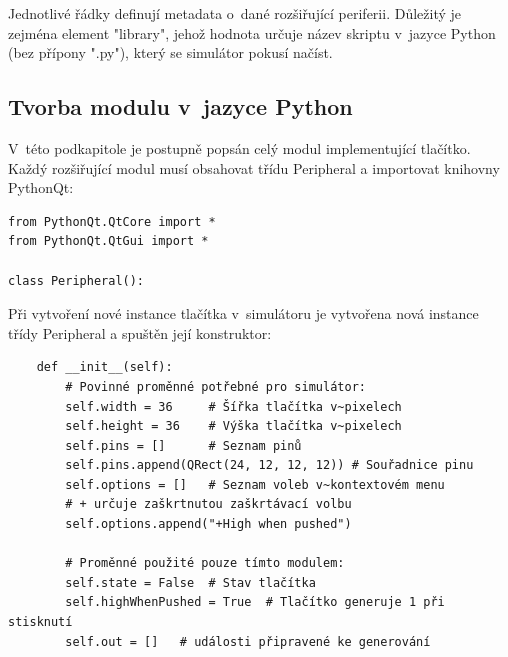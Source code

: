 Jednotlivé řádky definují metadata o~dané rozšiřující periferii. Důležitý je zejména element "library", jehož hodnota určuje název skriptu v~jazyce Python (bez přípony ".py"), který se simulátor pokusí načíst.

\subsection{Tvorba modulu v~jazyce Python}

V~této podkapitole je postupně popsán celý modul implementující tlačítko. Každý rozšiřující modul musí obsahovat třídu Peripheral a importovat knihovny PythonQt:

\begin{lstlisting}
from PythonQt.QtCore import *
from PythonQt.QtGui import *

class Peripheral():
\end{lstlisting}

Při vytvoření nové instance tlačítka v~simulátoru je vytvořena nová instance třídy Peripheral a spuštěn její konstruktor:

\begin{lstlisting}
	def __init__(self):
		# Povinné proměnné potřebné pro simulátor:
		self.width = 36		# Šířka tlačítka v~pixelech
		self.height = 36	# Výška tlačítka v~pixelech
		self.pins = []		# Seznam pinů
		self.pins.append(QRect(24, 12, 12, 12))	# Souřadnice pinu
		self.options = []	# Seznam voleb v~kontextovém menu
		# + určuje zaškrtnutou zaškrtávací volbu
		self.options.append("+High when pushed")

		# Proměnné použité pouze tímto modulem:
		self.state = False	# Stav tlačítka
		self.highWhenPushed = True	# Tlačítko generuje 1 při stisknutí
		self.out = []	# události připravené ke generování
\end{lstlisting}

